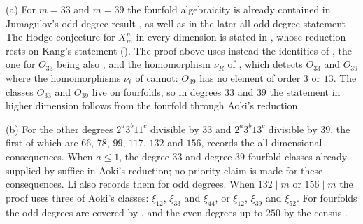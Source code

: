\begin{remark}\label{rem:new3339}
(a) For $m=33$ and $m=39$ the fourfold algebraicity is already
contained in Jumagulov's odd-degree result \cite{Jum26}, as well as in
the later all-odd-degree statement \cite{Li26a}. The Hodge conjecture
for $X^{n}_{m}$ in every dimension is stated in \cite{MMRV26}, whose reduction rests on Kang's
statement \cite[Corollary~3.2]{Kan16} (). The proof above
uses instead the identities of , the one for $O_{33}$
being also \cite[Theorem~1.4]{Jum26}, and the homomorphism $\nu_{R}$ of
, which detects $O_{33}$ and $O_{39}$ where the
homomorphisms $\nu_{\ell}$ of  cannot: $O_{39}$ has no element
of order $3$ or $13$. The classes $O_{33}$ and $O_{39}$ live on fourfolds, so
in degrees $33$ and $39$ the statement in higher dimension follows from the
fourfold through Aoki's reduction.

(b) For the other degrees $2^{a}3^{b}11^{c}$ divisible by $33$ and
$2^{a}3^{b}13^{c}$ divisible by $39$, the first of which are $66$, $78$,
$99$, $117$, $132$ and $156$,  records the
all-dimensional consequences. When $a\le1$, the degree-$33$ and
degree-$39$ fourfold classes already supplied by \cite{Jum26} suffice
in Aoki's reduction; no priority claim is made for these consequences.
Li \cite[\S5]{Li26b} also records them for odd degrees. When $132\mid m$ or $156\mid
m$ the proof uses three of Aoki's classes: $\xi_{12}$, $\xi_{33}$ and
$\xi_{44}$, or $\xi_{12}$, $\xi_{39}$ and $\xi_{52}$. For fourfolds the
odd degrees are covered by , and the even degrees up to
$250$ by the census \cite{Jum26b}.
\end{remark}

